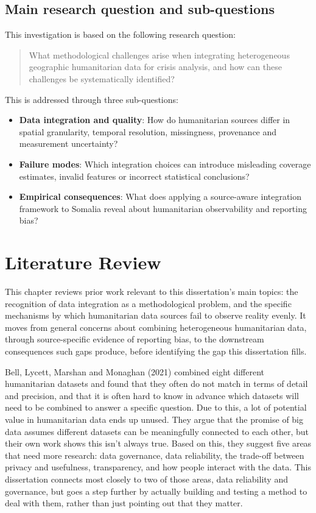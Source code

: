 \documentclass[12pt,a4paper]{article}
\begin{document}
\subsection{Main research question and sub-questions}

This investigation is based on the following research question:

\begin{quote}
What methodological challenges arise when integrating heterogeneous geographic humanitarian data for crisis analysis, and how can these challenges be systematically identified?
\end{quote}

This is addressed through three sub-questions:

\begin{itemize}[leftmargin=1.5cm]
\item[RQ1.] \textbf{Data integration and quality}: How do humanitarian sources differ in spatial granularity, temporal resolution, missingness, provenance and measurement uncertainty?
\item[RQ2.] \textbf{Failure modes}: Which integration choices can introduce misleading coverage estimates, invalid features or incorrect statistical conclusions?
\item[RQ3.] \textbf{Empirical consequences}: What does applying a source-aware integration framework to Somalia reveal about humanitarian observability and reporting bias?
\end{itemize}

\clearpage
\section{Literature Review}

This chapter reviews prior work relevant to this dissertation's main topics: the recognition of data integration as a methodological problem, and the specific mechanisms by which humanitarian data sources fail to observe reality evenly. It moves from general concerns about combining heterogeneous humanitarian data, through source-specific evidence of reporting bias, to the downstream consequences such gaps produce, before identifying the gap this dissertation fills.

Bell, Lycett, Marshan and Monaghan (2021) combined eight different humanitarian datasets and found that they often do not match in terms of detail and precision, and that it is often hard to know in advance which datasets will need to be combined to answer a specific question. Due to this, a lot of potential value in humanitarian data ends up unused. They argue that the promise of big data assumes different datasets can be meaningfully connected to each other, but their own work shows this isn't always true. Based on this, they suggest five areas that need more research: data governance, data reliability, the trade-off between privacy and usefulness, transparency, and how people interact with the data. This dissertation connects most closely to two of those areas, data reliability and governance, but goes a step further by actually building and testing a method to deal with them, rather than just pointing out that they matter.
\end{document}
